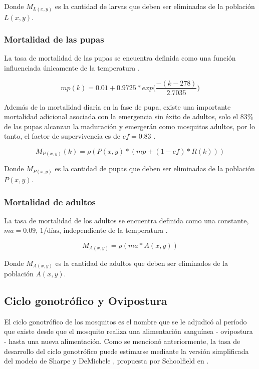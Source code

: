 Donde $M_{L(x,y)}$ es la cantidad de larvas que deben ser eliminadas de la población $L(x,y)$.

\subsubsection{Mortalidad de las pupas}
La tasa de mortalidad de las pupas se encuentra definida como una función influenciada únicamente
de la temperatura \cite{otero2006stochastic}.

\begin{equation}
\label{eq:mortalidad-natural-pupas}
    mp(k) = 0.01 + 0.9725 * exp\bigg( \frac{-(k - 278)}{2.7035}\bigg)
\end{equation}

Además de la mortalidad diaria en la fase de pupa, existe una importante mortalidad adicional
asociada con la emergencia sin éxito de adultos, solo el 83\%  de las pupas alcanzan la maduración
y emergerán como mosquitos adultos, por lo tanto, el factor de supervivencia es de $ef=0.83$
\cite{otero2006stochastic}.

\begin{equation}
    M_{P(x,y)}(k) = \rho(P(x,y) * (mp + (1 - ef) * R(k)))
\end{equation}

Donde $M_{P(x,y)}$ es la cantidad de pupas que deben ser eliminadas de la población $P(x,y)$.

\subsubsection{Mortalidad de adultos}
La tasa de mortalidad de los adultos se encuentra definida como una constante, $ma = 0.09$,
$1/\text{días}$, independiente de la temperatura \cite{otero2006stochastic}.

\begin{equation}
    M_{A(x,y)} = \rho(ma * A(x,y))
\end{equation}

Donde $M_{A(x,y)}$ es la cantidad de adultos que deben ser eliminados de la población $A(x,y)$.

\subsection{Ciclo gonotrófico y Ovipostura}
El ciclo gonotrófico de los mosquitos es el nombre que se le adjudicó al período que existe desde
que el mosquito realiza una alimentación sanguínea - ovipostura - hasta una nueva alimentación.
Como se mencionó anteriormente, la tasa de desarrollo del ciclo gonotrófico puede estimarse mediante la versión simplificada del modelo de Sharpe y DeMichele \cite{sharpe1977reaction}, propuesta por Schoolfield en \cite{schoolfield1981non}.

